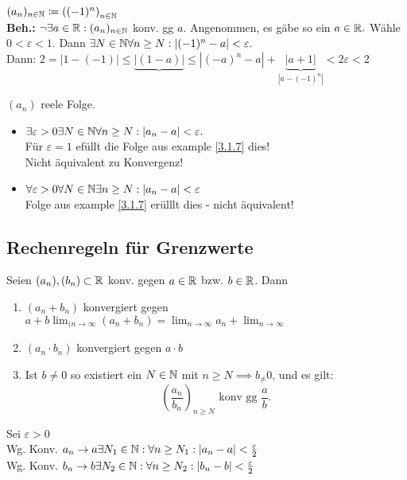 \documentclass[consecutivenumbering]{gadsescript}
\begin{document}
\begin{subexample}
	$ (a_n)_{n\in\mathbb{N}} \coloneqq \left( (-1)^n\right)_{n\in \mathbb{N}} $\\
	\textbf{Beh.:} $ \neg \exists a \in \mathbb{R} : (a_n)_{n\in\mathbb{N}} $ konv. gg $a$. Angenommen, es gäbe so ein $ a \in \mathbb{R}. $ Wähle $ 0 < \varepsilon < 1 $. Dann $\exists N \in \mathbb{N} \forall n \geq N : \left| (-1)^n - a \right| < \varepsilon. $\\
	Dann: $ 2 = | 1- (-1) | \leq \underbrace{ | ( 1 - a ) |}{\leq \left| (-a)^n - a\right|} + \underbrace{ | a + 1 | }_{\left| a - (-1)^n \right|} < 2 \varepsilon < 2 $
\end{subexample}

\begin{subexample}
	$ (a_n) $ reele Folge.
	\begin{itemize}
		\item $ \exists \varepsilon > 0 \exists N \in \mathbb{N} \forall n \geq N : | a_n - a | < \varepsilon.$\\
			Für $ \varepsilon = 1 $ efüllt die Folge aus example \ref{3.1.7} dies!\\
			Nicht äquivalent zu Konvergenz!
		\item $ \forall \varepsilon > 0 \forall N \in \mathbb{N} \exists n \geq N : | a_n - a | < \varepsilon $\\
			Folge aus example \ref{3.1.7} erülllt dies - nicht äquivalent!
	\end{itemize}
\end{subexample}

\subsection{Rechenregeln für Grenzwerte}
\begin{subtheorem}
	Seien $ (a_n), (b_n) \subset \mathbb{R} $ konv. gegen $ a \in \mathbb{R} $ bzw. $ b \in \mathbb{R} $. Dann
	\begin{enumerate}[label=(\roman*)]
		\item $ (a_n+b_n) $ konvergiert gegen $ a+ b \lim_{(n\to\infty} ( a_n + b_n ) = \lim_{n\to\infty}a_n + \lim_{n\to\infty} $
		\item $(a_n\cdot b_n) $ konvergiert gegen $ a\cdot b$
		\item Ist $ b\neq 0 $ so existiert ein $ N \in \mathbb{N} $ mit $ n \geq N \implies b_ \neq 0 $, und es gilt:
			\[ \left( \frac{a_n}{b_n} \right)_{n\geq N} \text{ konv gg } \frac{a}{b}. \]
	\end{enumerate}
\end{subtheorem}
\begin{subproof*}
	Sei $ \varepsilon > 0 $\\
	Wg. Konv. $ a_n \to a \exists N_1 \in \mathbb{N} : \forall n \geq N_1 : | a_n - a| < \frac{\varepsilon}{2} $\\
	Wg. Konv. $ b_n \to b \exists N_2 \in \mathbb{N}: \forall n \geq N_2 : | b_n - b | < \frac{\varepsilon}{2} $
\end{subproof*}
\end{document}
